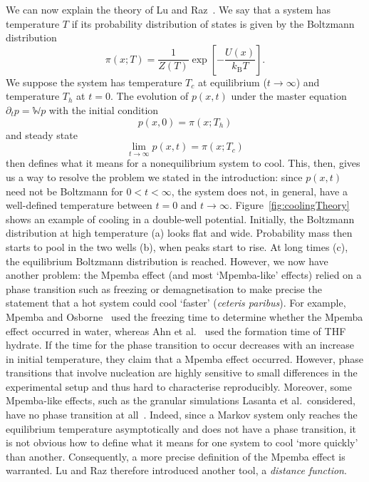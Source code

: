 \documentclass[hyperref={colorlinks=true, urlcolor=blue, citecolor=blue, final, bound}]{sfuthesis}
\newcommand{\kB}{k_{\mathrm{B}}}
\begin{document}
We can now explain the theory of Lu and Raz~\cite{Lu2017}. We say that a system has temperature $T$ if its probability distribution of states is given by the Boltzmann distribution
\begin{equation}
    \pi(x;T) = \frac 1{Z(T)} \exp[-\frac{U(x)}{\kB T}].
\end{equation}
We suppose the system has temperature $T_c$ at equilibrium ($t\rightarrow\infty$) and temperature $T_h$ at $t=0$. The evolution of $p(x,t)$ under the master equation $\partial_t{p}=\mathbb W p$ with the initial condition 
\begin{equation}
    p(x,0)=\pi(x;T_h)\label{eq:initialCondition}
\end{equation} 
and steady state 
\begin{equation}
    \lim_{t\rightarrow\infty} p(x,t) = \pi(x;T_c)\label{eq:equilibriumCondition}
\end{equation}
then defines what it means for a nonequilibrium system to cool. This, then, gives us a way to resolve the problem we stated in the introduction: since $p(x,t)$ need not be Boltzmann for $0<t<\infty$, the system does not, in general, have a well-defined temperature between $t=0$ and $t\rightarrow\infty$. Figure~\ref{fig:coolingTheory} shows an example of cooling in a double-well potential. Initially, the Boltzmann distribution at high temperature (a) looks flat and wide. Probability mass then starts to pool in the two wells (b), when peaks start to rise. At long times (c), the equilibrium Boltzmann distribution is reached. However, we now have another problem: the Mpemba effect (and most `Mpemba-like' effects) relied on a phase transition such as freezing or demagnetisation to make precise the statement that a hot system could cool `faster' (\textit{ceteris paribus}). For example, Mpemba and Osborne~\cite{Mpemba1969} used the freezing time to determine whether the Mpemba effect occurred in water, whereas Ahn et al.~\cite{Ahn2016} used the formation time of THF hydrate. If the time for the phase transition to occur decreases with an increase in initial temperature, they claim that a Mpemba effect occurred. However, phase transitions that involve nucleation are highly sensitive to small differences in the experimental setup and thus hard to characterise reproducibly. Moreover, some Mpemba-like effects, such as the granular simulations Lasanta et al.\ considered, have no phase transition at all~\cite{Lasanta2017}. Indeed, since a Markov system only reaches the equilibrium temperature asymptotically and does not have a phase transition, it is not obvious how to define what it means for one system to cool `more quickly' than another. Consequently, a more precise definition of the Mpemba effect is warranted. Lu and Raz therefore introduced another tool, a \textit{distance function}.
\end{document}
